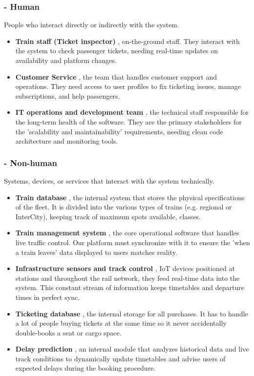 \documentclass{article}
\begin{document}
\subsubsection*{- Human}
People who interact directly or indirectly with the system.
\begin{itemize} 
    \item \textbf{Train staff (Ticket inspector)} \label{STK2}, on-the-ground staff. They interact with the system to check passenger tickets, needing real-time updates on availability and platform changes.
    \item \textbf{Customer Service} \label{STK3}, the team that handles customer support and operations. They need access to user profiles to fix ticketing issues, manage subscriptions, and help passengers. 
    \item \textbf{IT operations and development team} \label{STK5}, the technical staff responsible for the long-term health of the software. They are the primary stakeholders for the 'scalability and maintainability' requirements, needing clean code architecture and monitoring tools.
\end{itemize}

\subsubsection*{- Non-human}
Systems, devices, or services that interact with the system technically.
\begin{itemize}
    \item \textbf{Train database} \label{STK7}, the internal system that stores the physical specifications of the fleet. It is divided into the various types of trains (e.g. regional or InterCity), keeping track of maximum spots available, classes. 
    \item \textbf{Train management system} \label{STK8}, the core operational software that handles live traffic control. Our platform must synchronize with it to ensure the 'when a train leaves' data displayed to users matches reality. 
    \item \textbf{Infrastructure sensors and track control} \label{STK9}, IoT devices positioned at stations and throughout the rail network, they feed real-time data into the system. This constant stream of information keeps timetables and departure times in perfect sync. 
    \item \textbf{Ticketing database} \label{STK10}, the internal storage for all purchases. It has to handle a lot of people buying tickets at the same time so it never accidentally double-books a seat or cargo space.
    \item \textbf{Delay prediction} \label{STK11}, an internal module that analyzes historical data and live track conditions to dynamically update timetables and advise users of expected delays during the booking procedure.
\end{itemize}
\end{document}
